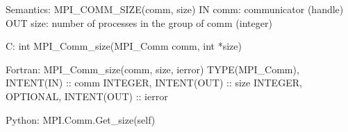 Semantics:
MPI_COMM_SIZE(comm, size)
IN comm: communicator (handle)
OUT size: number of processes in the group of comm (integer)

C:
int MPI_Comm_size(MPI_Comm comm, int *size)

Fortran:
MPI_Comm_size(comm, size, ierror)
TYPE(MPI_Comm), INTENT(IN) :: comm
INTEGER, INTENT(OUT) :: size
INTEGER, OPTIONAL, INTENT(OUT) :: ierror

Python:
MPI.Comm.Get_size(self)
